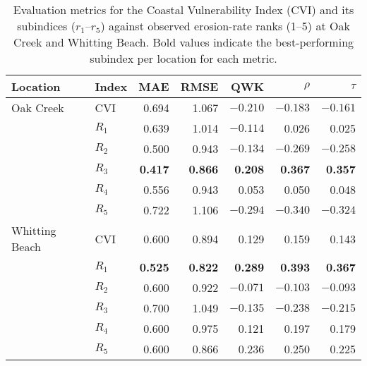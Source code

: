 \begin{table}[htbp]
\centering
\caption{Evaluation metrics for the Coastal Vulnerability Index (CVI) and its
subindices ($r_1$--$r_5$) against observed erosion-rate ranks (1--5) at Oak
Creek and Whitting Beach. Bold values indicate the best-performing subindex per
location for each metric.}
\label{tab:cvi_eval_oak_whitting}
\begin{tabular}{l l r r r r r}
\toprule
Location & Index & MAE & RMSE & QWK & $\rho$ & $\tau$ \\
\midrule
Oak Creek & CVI   & 0.694 & 1.067 & $-0.210$ & $-0.183$ & $-0.161$ \\
          & $R_1$ & 0.639 & 1.014 & $-0.114$ &  0.026 &  0.025 \\
          & $R_2$ & 0.500 & 0.943 & $-0.134$ & $-0.269$ & $-0.258$ \\
          & $R_3$ & \textbf{0.417} & \textbf{0.866} & \textbf{0.208} & \textbf{0.367} & \textbf{0.357} \\
          & $R_4$ & 0.556 & 0.943 &  0.053 &  0.050 &  0.048 \\
          & $R_5$ & 0.722 & 1.106 & $-0.294$ & $-0.340$ & $-0.324$ \\
\midrule
Whitting Beach & CVI   & 0.600 & 0.894 & 0.129 & 0.159 & 0.143 \\
               & $R_1$ & \textbf{0.525} & \textbf{0.822} & \textbf{0.289} & \textbf{0.393} & \textbf{0.367} \\
               & $R_2$ & 0.600 & 0.922 & $-0.071$ & $-0.103$ & $-0.093$ \\
               & $R_3$ & 0.700 & 1.049 & $-0.135$ & $-0.238$ & $-0.215$ \\
               & $R_4$ & 0.600 & 0.975 &  0.121 &  0.197 &  0.179 \\
               & $R_5$ & 0.600 & 0.866 &  0.236 &  0.250 &  0.225 \\
\bottomrule
\end{tabular}
\end{table}
